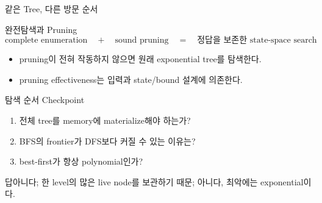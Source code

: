 \begin{frame}{같은 Tree, 다른 방문 순서}
\centering{}
\end{frame}
\begin{frame}{완전탐색과 Pruning}
\[
\text{complete enumeration}
\quad+\quad
\text{sound pruning}
\quad=\quad
\text{정답을 보존한 state-space search}
\]
\begin{itemize}
\item pruning이 전혀 작동하지 않으면 원래 exponential tree를 탐색한다.
\item pruning effectiveness는 입력과 state/bound 설계에 의존한다.
\end{itemize}
\end{frame}
\begin{frame}{탐색 순서 Checkpoint}
\begin{enumerate}
\item 전체 tree를 memory에 materialize해야 하는가?
\item BFS의 frontier가 DFS보다 커질 수 있는 이유는?
\item best-first가 항상 polynomial인가?
\end{enumerate}
\begin{exampleblock}{답}아니다; 한 level의 많은 live node를 보관하기 때문; 아니다, 최악에는 exponential이다.\end{exampleblock}
\end{frame}

